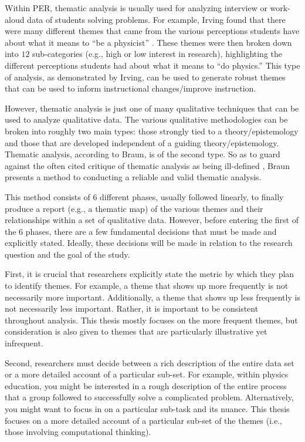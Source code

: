 \documentclass{msuphddissertation}
\begin{document}
\begin{doublespace}
Within PER, thematic analysis is usually used for analyzing interview or work-aloud data of students solving problems.  For example, Irving found that there were many different themes that came from the various perceptions students have about what it means to ``be a physicist'' \cite{Irving2016}.  These themes were then broken down into $12$ sub-categories (e.g., high or low interest in research), highlighting the different perceptions students had about what it means to ``do physics.''  This type of analysis, as demonstrated by Irving, can be used to generate robust themes that can be used to inform instructional changes/improve instruction.

However, thematic analysis is just one of many qualitative techniques that can be used to analyze qualitative data.  The various qualitative methodologies can be broken into roughly two main types: those strongly tied to a theory/epistemology and those that are developed independent of a guiding theory/epistemology.  Thematic analysis, according to Braun, is of the second type.  So as to guard against the often cited critique of thematic analysis as being ill-defined \cite{Antaki2002}, Braun presents a method to conducting a reliable and valid thematic analysis.  %

This method consists of $6$ different phases, usually followed linearly, to finally produce a report (e.g., a thematic map) of the various themes and their relationships within a set of qualitative data.  However, before entering the first of the $6$ phases, there are a few fundamental decisions that must be made and explicitly stated.  Ideally, these decisions will be made in relation to the research question and the goal of the study.

First, it is crucial that researchers explicitly state the metric by which they plan to identify themes.  For example, a theme that shows up more frequently is not necessarily more important.  Additionally, a theme that shows up less frequently is not necessarily less important.  Rather, it is important to be consistent throughout analysis.  This thesis mostly focuses on the more frequent themes, but consideration is also given to themes that are particularly illustrative yet infrequent.

Second, researchers must decide between a rich description of the entire data set or a more detailed account of a particular sub-set.  For example, within physics education, you might be interested in a rough description of the entire process that a group followed to successfully solve a complicated problem.  Alternatively, you might want to focus in on a particular sub-task and its nuance.  This thesis focuses on a more detailed account of a particular sub-set of the themes (i.e., those involving computational thinking).


\end{doublespace}
\end{document}
